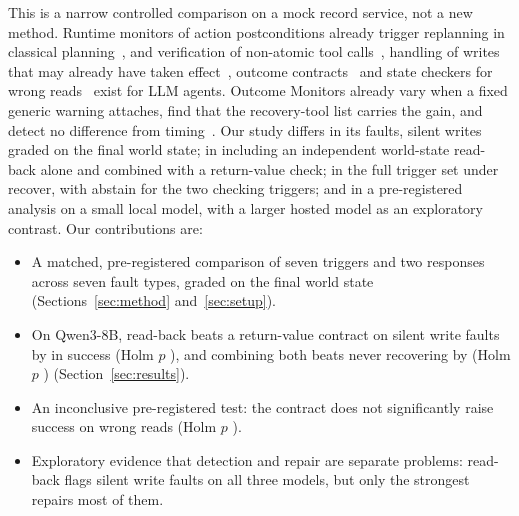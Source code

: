 This is a narrow controlled comparison on a mock record service, not a new method. Runtime monitors of
action postconditions already trigger replanning in classical planning~\cite{cardoso2026rvreplan},
and verification of non-atomic tool calls~\cite{mansoor2026verified}, handling of writes that may
already have taken effect~\cite{li2026where}, outcome contracts~\cite{panthi2026outcome} and state
checkers for wrong reads~\cite{zhang2026rite} exist for LLM agents. Outcome Monitors already vary when
a fixed generic warning attaches, find that the recovery-tool list carries the gain, and detect no
difference from timing~\cite{panthi2026outcome}. Our study differs in its faults, silent writes graded on the final
world state; in including an independent world-state read-back alone and combined with a return-value
check; in the full trigger set under recover, with abstain for the two checking triggers; and in a
pre-registered analysis on a small local model, with a larger hosted model as an exploratory contrast. Our contributions are:
\begin{itemize}
  \item A matched, pre-registered comparison of seven triggers and two responses across seven fault
        types, graded on the final world state (Sections~\ref{sec:method} and~\ref{sec:setup}).
  \item On Qwen3-8B, read-back beats a return-value contract on silent write faults by \RPOneDiff{} in
        success (Holm $p$ \RPOneHolmP{}), and combining both beats never recovering by
        \RPThreeDiff{} (Holm $p$ \RPThreeHolmP{}) (Section~\ref{sec:results}).
  \item An inconclusive pre-registered test: the contract does not significantly raise success on
        wrong reads (Holm $p$ \RPTwoHolmP{}).
  \item Exploratory evidence that detection and repair are separate problems: read-back flags silent
        write faults on all three models, but only the strongest repairs most of them.
\end{itemize}
